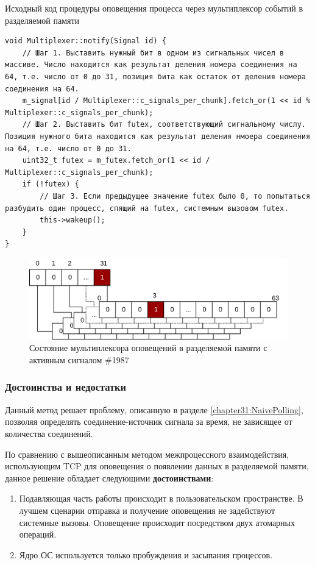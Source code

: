 \begin{algorithm}[!h]
\caption{Исходный код процедуры оповещения процесса через мультиплексор событий в разделяемой памяти}
\label{chapter31:SignalCode}
\begin{lstlisting}[frame=tlrb]
void Multiplexer::notify(Signal id) {
	// Шаг 1. Выставить нужный бит в одном из сигнальных чисел в массиве. Число находится как результат деления номера соединения на 64, т.е. число от 0 до 31, позиция бита как остаток от деления номера соединения на 64.
	m_signal[id / Multiplexer::c_signals_per_chunk].fetch_or(1 << id % Multiplexer::c_signals_per_chunk);
    // Шаг 2. Выставить бит futex, соответствующий сигнальному числу. Позиция нужного бита находится как результат деления нмоера соединения на 64, т.е. число от 0 до 31.
	uint32_t futex = m_futex.fetch_or(1 << id / Multiplexer::c_signals_per_chunk);
	if (!futex) {
		// Шаг 3. Если предыдущее значение futex было 0, то попытаться разбудить один процесс, спящий на futex, системным вызовом futex.
		this->wakeup();
	}
}
\end{lstlisting}
\end{algorithm}

\begin{figure}[!h]
\caption{Состояние мультиплексора оповещений в разделяемой памяти с активным сигналом \#1987}
\label{chapter31:Mux1987State}
\includegraphics[width=\textwidth]{../../graphics/schemes/futexready}
\end{figure}

\subsubsection{Достоинства и недостатки}

Данный метод решает проблему, описанную в разделе \ref{chapter31:NaivePolling}, позволяя определять соединение-источник сигнала за время, не зависящее от количества соединений.

По сравнению с вышеописанным методом межпроцессного взаимодействия, использующим TCP для оповещения о появлении данных в разделяемой памяти, данное решение обладает следующими \textbf{достоинствами}:
\begin{enumerate}
\item Подавляющая часть работы происходит в пользовательском пространстве. В лучшем сценарии отправка и получение оповещения не задействуют системные вызовы. Оповещение происходит посредством двух атомарных операций.
\item Ядро ОС используется только пробуждения и засыпания процессов.
\end{enumerate}

